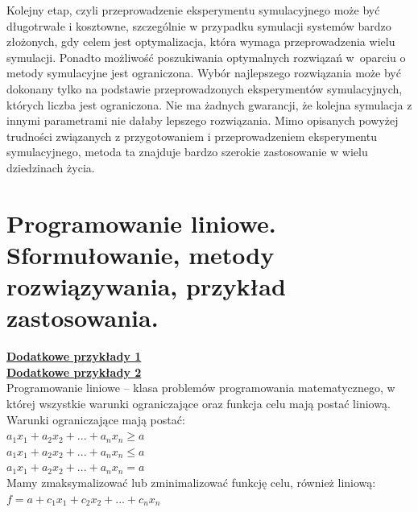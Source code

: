 \documentclass[10pt, a
4paper]{article}
\begin{document}
\indent Kolejny etap, czyli przeprowadzenie eksperymentu symulacyjnego może być długotrwałe i kosztowne, szczególnie w przypadku symulacji systemów bardzo złożonych, gdy celem jest optymalizacja, która wymaga przeprowadzenia wielu symulacji. Ponadto możliwość poszukiwania optymalnych rozwiązań w~oparciu o metody symulacyjne jest ograniczona. Wybór najlepszego rozwiązania może być dokonany tylko na podstawie przeprowadzonych eksperymentów symulacyjnych, których liczba jest ograniczona. Nie ma żadnych gwarancji, że kolejna symulacja z innymi parametrami nie dałaby lepszego rozwiązania.
Mimo opisanych powyżej trudności związanych z przygotowaniem i przeprowadzeniem eksperymentu symulacyjnego, metoda ta znajduje bardzo szerokie zastosowanie w wielu dziedzinach życia.



\newpage
\section{Programowanie liniowe. Sformułowanie, metody rozwiązywania, przykład zastosowania.}
\noindent\textbf{\href{http://tarapata.strefa.pl/p_ekonometria/download/ekonometria\%20_cz3_1a.pdf}{Dodatkowe przykłady 1}} \\
\textbf{\href{https://www.ksiegarnia.beck.pl/media/product_custom_files/1/1/11643-badania-operacyjne-z-wykorzytsaniem-winqsb-dariusz-siudak-darmowy-fragment.pdf}{Dodatkowe przykłady 2}} \\


Programowanie liniowe – klasa problemów programowania matematycznego, w której wszystkie warunki ograniczające oraz funkcja celu mają postać liniową. Warunki ograniczające mają postać:\\
$a_{1}x_{1} + a_{2}x_{2} + ... + a_{n}x_{n} \geq a$ \\
$a_{1}x_{1} + a_{2}x_{2} + ... + a_{n}x_{n} \leq a$ \\
$a_{1}x_{1} + a_{2}x_{2} + ... + a_{n}x_{n} = a$ \\

\noindent Mamy zmaksymalizować lub zminimalizować funkcję celu, również liniową: \\
$f = a + c_{1}x_{1} + c_{2}x_{2} + ... + c_{n}x_{n}$ \\
\end{document}

